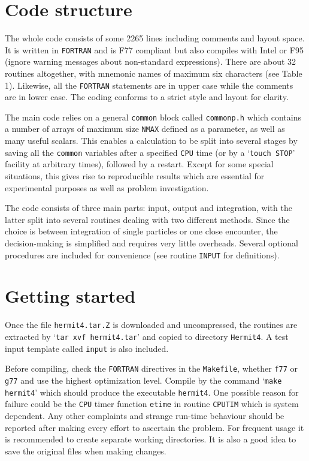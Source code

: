 \documentclass[12pt]{article}
\begin{document}
\section{Code structure}

The whole code consists of some 2265 lines including comments and layout
space.
It is written in {\tt FORTRAN} and is F77 compliant but also compiles
with Intel or F95 (ignore warning messages about non-standard expressions).
There are about 32 routines altogether, with mnemonic names of maximum six
characters (see Table 1).
Likewise, all the {\tt FORTRAN} statements are in upper case while the
comments are in lower case.
The coding conforms to a strict style and layout for clarity.

The main code relies on a general {\tt common} block called
{\tt commonp.h} which contains a number of arrays of maximum size {\tt NMAX}
defined as a parameter, as well as many useful scalars.
This enables a calculation to be split into several stages by saving all
the {\tt common} variables after a specified {\tt CPU} time (or by a
`{\tt touch STOP}' facility at arbitrary times), followed by a restart.
Except for some special situations, this gives rise to reproducible results
which are essential for experimental purposes as well as problem
investigation.

The code consists of three main parts: input, output and integration, with
the latter split into several routines dealing with two different methods.
Since the choice is between integration of single particles or one close
encounter, the decision-making is simplified and requires very little
overheads.
Several optional procedures are included for convenience (see routine
{\tt INPUT} for definitions).

\section{Getting started}

Once the file {\tt hermit4.tar.Z} is downloaded and uncompressed, the routines
are extracted by `{\tt tar xvf hermit4.tar}' and copied to directory
{\tt Hermit4}.
A test input template called {\tt input} is also included.

Before compiling, check the {\tt FORTRAN} directives in the {\tt Makefile},
\ie whether {\tt f77} or {\tt g77} and use the highest optimization level.
Compile by the command `{\tt make hermit4}' which should produce the
executable {\tt hermit4}.
One possible reason for failure could be the {\tt CPU} timer function
{\tt etime} in routine {\tt CPUTIM} which is system dependent.
Any other complaints and strange run-time behaviour should be reported after
making every effort to ascertain the problem.
For frequent usage it is recommended to create separate working directories.
It is also a good idea to save the original files when making changes.
\end{document}
